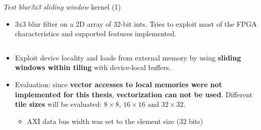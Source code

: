 \documentclass[8pt,a4paper,oneside,hidelinks,aspectratio=169,dvipsnames]{beamer}
\begin{document}
\begin{frame}{\textit{Test blur3x3 sliding window} kernel (1)}
  \begin{itemize}
    \item 3x3 blur filter on a 2D array of 32-bit ints. Tries to exploit most of the FPGA characteristics and supported features implemented.
          \begin{figure}[H]
            \centering
            \begin{minipage}{0.5\textwidth}
              \inputminted[tabsize=2,frame=single,rulecolor=gray,fontsize=\fontsize{5}{5}]{cpp}{fig/test_blur3x3_sliding_window.cpp}
            \end{minipage}
          \end{figure}
    \item Exploit device locality and loads from external memory by using \textbf{sliding windows within tiling} with device-local buffers.
    \item Evaluation: since \textbf{vector accesses to local memories were not implemented for this thesis}, \textbf{vectorization can not be used}. Different \textbf{tile sizes} will be evaluated: $8 \times 8$, $16 \times 16$ and $32 \times 32$.
          \begin{itemize}
            \item AXI data bus width was set to the element size (32 bits)
          \end{itemize}
  \end{itemize}
\end{frame}
\end{document}
